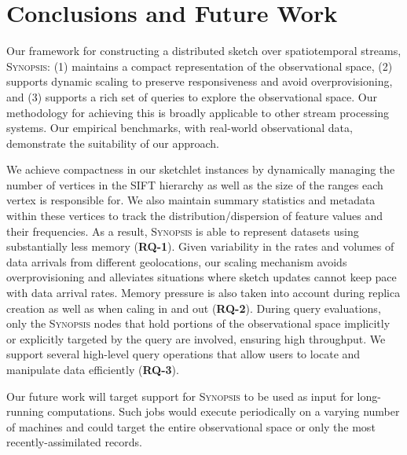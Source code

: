 \section{Conclusions and Future Work}
\label{sec:conclusions}
Our framework for constructing a distributed sketch over spatiotemporal streams, \textsc{Synopsis}: (1) maintains a compact representation of the observational space, (2) supports dynamic scaling to preserve responsiveness and avoid overprovisioning, and (3) supports a rich set of queries to explore the observational space. Our methodology for achieving this is broadly applicable to other stream processing systems.  Our empirical benchmarks, with real-world observational data, demonstrate the suitability of our approach.

We achieve compactness in our sketchlet instances by dynamically managing the number of vertices in the SIFT hierarchy as well as the size of the ranges each vertex is responsible for. We also maintain summary statistics and metadata within these vertices to track the distribution/dispersion of feature values and their frequencies. As a result, \textsc{Synopsis} is able to represent datasets using substantially less memory (\textbf{RQ-1}). Given variability in the rates and volumes of data arrivals from different geolocations, our scaling mechanism avoids overprovisioning and alleviates situations where sketch updates cannot keep pace with data arrival rates. Memory pressure is also taken into account during replica creation as well as when caling in and out (\textbf{RQ-2}). During query evaluations, only the \textsc{Synopsis} nodes that hold portions of the observational space implicitly or explicitly targeted by the query are involved, ensuring high throughput. We support several high-level query operations that allow users to locate and manipulate data efficiently (\textbf{RQ-3}).

Our future work will target support for \textsc{Synopsis} to be used as input for long-running computations. Such jobs would execute periodically on a varying number of machines and could target the entire observational space or only the most recently-assimilated records.
